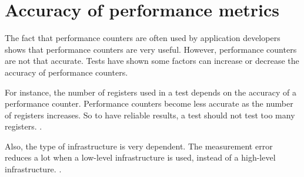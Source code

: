 \section{Accuracy of performance metrics}
The fact that performance counters are often used by application developers shows that performance counters are very useful. However, performance counters are not that accurate. Tests have shown some factors can increase or decrease the accuracy of performance counters.


For instance, the number of registers used in a test depends on the accuracy of a performance counter. Performance counters become less accurate as the number of registers increases. So to have reliable results, a test should not test too many registers. \cite{AccuracyPerformanceCounter}.

Also, the type of infrastructure is very dependent. The measurement error reduces a lot when a low-level infrastructure is used, instead of a high-level infrastructure. \cite{AccuracyPerformanceCounter}.

